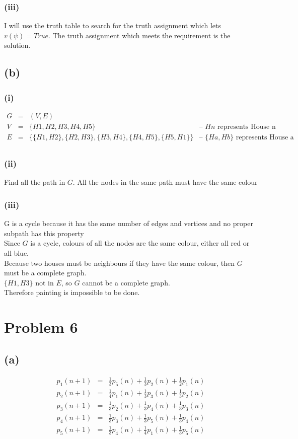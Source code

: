 \documentclass{article} %
\begin{document}
\subsubsection*{(iii)}
I will use the truth table to search for the truth assignment which lets $v(\psi) = True$. The truth assignment which meets the requirement is the solution.\\
\subsection*{(b)}
\subsubsection*{(i)}
\[\begin{array}{rcll}
    G &=& (V, E)\\
    V &=& \{H1,H2,H3,H4,H5\}&\mbox{-- $Hn$ represents House n}\\
    E &=& \{\{H1, H2\}, \{H2, H3\}, \{H3, H4\}, \{H4, H5\}, \{H5, H1\}\}&\mbox{-- $\{Ha,Hb\}$ represents House a and b are neighbours}\\
\end{array}\]
\subsubsection*{(ii)}
Find all the path in $G$. All the nodes in the same path must have the same colour\\
\subsubsection*{(iii)}
G is a cycle because it has the same number of edges and vertices and no proper subpath has this property\\
Since $G$ is a cycle, colours of all the nodes are the same colour, either all red or all blue.\\
Because two houses must be neighbours if they have the same colour, then $G$ must be a complete graph.\\
$\{H1, H3\}$ not in $E$, so $G$ cannot be a complete graph.\\
Therefore painting is impossible to be done.\\
\section*{Problem 6}
\subsection*{(a)}
\[\begin{array}{rcl}
    p_1(n+1) &=& \frac{1}{3} p_5(n) + \frac{1}{3} p_2(n) + \frac{1}{2}p_1(n)\\
    p_2(n+1) &=& \frac{1}{4} p_1(n) + \frac{1}{3} p_3(n) + \frac{1}{3}p_2(n)\\
    p_3(n+1) &=& \frac{1}{3} p_2(n) + \frac{1}{3} p_4(n) + \frac{1}{3}p_3(n)\\
    p_4(n+1) &=& \frac{1}{3} p_3(n) + \frac{1}{3} p_5(n) + \frac{1}{3}p_4(n)\\
    p_5(n+1) &=& \frac{1}{3} p_4(n) + \frac{1}{4} p_1(n) + \frac{1}{3}p_5(n)\\
\end{array}\]
\end{document}
